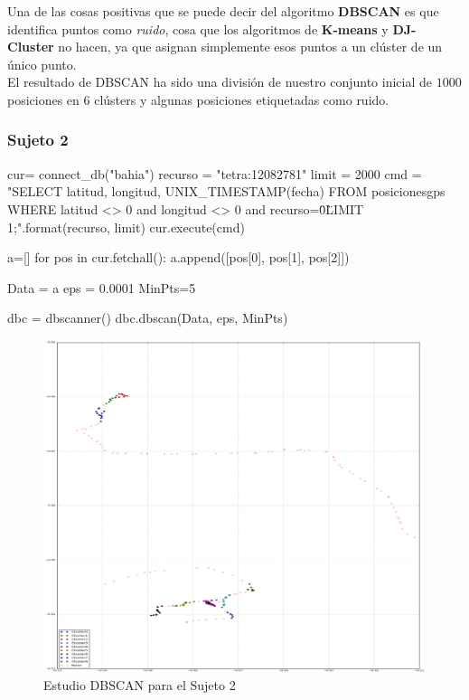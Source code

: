 \documentclass[a4paper, 12pt]{article}
\begin{document}
Una de las cosas positivas que se puede decir del algoritmo \textbf{DBSCAN} es que identifica puntos como \textit{ruido}, cosa que los algoritmos de \textbf{K-means} y \textbf{DJ-Cluster} no hacen, ya que asignan simplemente esos puntos a un cl\'uster de un \'unico punto.\\

El resultado de DBSCAN ha sido una divisi\'on de nuestro conjunto inicial de $1000$ posiciones en 6 cl\'usters y algunas posiciones etiquetadas como ruido.


\subsubsection{Sujeto 2}

\begin{python}
cur= connect_db("bahia")
recurso = "tetra:12082781"
limit = 2000
cmd = "SELECT latitud, longitud, UNIX_TIMESTAMP(fecha) 
	FROM posicionesgps 
	WHERE latitud <> 0 and longitud <> 0 and recurso=\"{0}\" 
	LIMIT {1};".format(recurso, limit)
cur.execute(cmd)

a=[]
for pos in cur.fetchall():
    a.append([pos[0], pos[1], pos[2]])

Data = a
eps = 0.0001
MinPts=5

dbc = dbscanner()
dbc.dbscan(Data, eps, MinPts)
\end{python}

\begin{figure}[H]
	\includegraphics[width=15cm]{../comparativa/dbscanSujeto2.png}
	\caption{Estudio DBSCAN para el Sujeto 2}
\end{figure}
\end{document}

